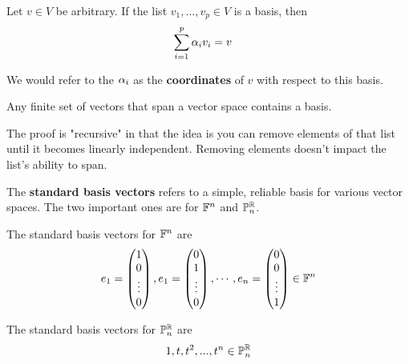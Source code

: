 \begin{remark}
    Let $v \in V$ be arbitrary. If the list $v_1, ..., v_p \in V$ is a basis, then
    \begin{align*}
        \sum_{i = 1}^{p} \alpha_i v_i &= v
    \end{align*}

    We would refer to the $\alpha_i$ as the \textbf{coordinates} of $v$ with respect to this basis.
\end{remark}

\begin{thm}
    Any finite set of vectors that span a vector space contains a basis.
\end{thm}
\begin{remark}
    The proof is "recursive" in that the idea is you can remove elements of that list until it becomes linearly independent. Removing elements
    doesn't impact the list's ability to span.
\end{remark}

\begin{definition}
    The \textbf{standard basis vectors} refers to a simple, reliable basis for various vector spaces. The two important ones are for $\mathbb{F}^n$ and 
    $\mathbb{P}^{\mathbb{R}}_n$.

    The standard basis vectors for $\mathbb{F}^n$ are
    \begin{align*}
        e_1 = \begin{pmatrix} 1 \\ 0 \\ \vdots \\ 0 \end{pmatrix}, e_1 = \begin{pmatrix} 0 \\ 1 \\ \vdots \\ 0 \end{pmatrix}, \cdots, e_n = \begin{pmatrix} 0 \\ 0 \\ \vdots \\ 1 \end{pmatrix} \in \mathbb{F}^n
    \end{align*}

    The standard basis vectors for $\mathbb{P}^{\mathbb{R}}_n$ are
    \begin{align*}
        1, t, t^2, ..., t^n \in \mathbb{P}^{\mathbb{R}}_n
    \end{align*}

\end{definition}
